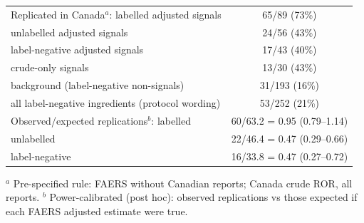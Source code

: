 \documentclass[11pt]{article}
\begin{document}
\begin{table}[t]
\begin{tabular}{p{8.6cm}cc}
Replicated in Canada$^a$: labelled adjusted signals & \multicolumn{2}{c}{65/89 (73\%)} \\
\quad unlabelled adjusted signals & \multicolumn{2}{c}{24/56 (43\%)} \\
\quad label-negative adjusted signals & \multicolumn{2}{c}{17/43 (40\%)} \\
\quad crude-only signals & \multicolumn{2}{c}{13/30 (43\%)} \\
\quad background (label-negative non-signals) & \multicolumn{2}{c}{31/193 (16\%)} \\
\quad all label-negative ingredients (protocol wording) & \multicolumn{2}{c}{53/252 (21\%)} \\
Observed/expected replications$^b$: labelled & \multicolumn{2}{c}{60/63.2 = 0.95 (0.79--1.14)} \\
\quad unlabelled & \multicolumn{2}{c}{22/46.4 = 0.47 (0.29--0.66)} \\
\quad label-negative & \multicolumn{2}{c}{16/33.8 = 0.47 (0.27--0.72)} \\
\bottomrule
\end{tabular}

\smallskip
\raggedright\footnotesize $^a$ Pre-specified rule: FAERS without Canadian reports; Canada crude ROR, all reports.
$^b$ Power-calibrated (post hoc): observed replications vs those expected if each FAERS adjusted estimate were true.
\end{table}
\end{document}

